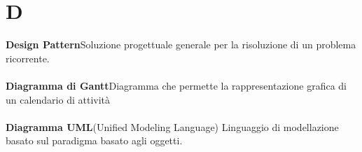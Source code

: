 \newpage
\section{D}\label{l:D}
\textbf{Design Pattern}\newline Soluzione progettuale generale per la risoluzione di un problema ricorrente.\\\\
\textbf{Diagramma di Gantt}\newline Diagramma che permette la rappresentazione grafica di un calendario di attività \\\\
\textbf{Diagramma UML}\newline (Unified Modeling Language) Linguaggio di modellazione basato sul paradigma basato agli oggetti.